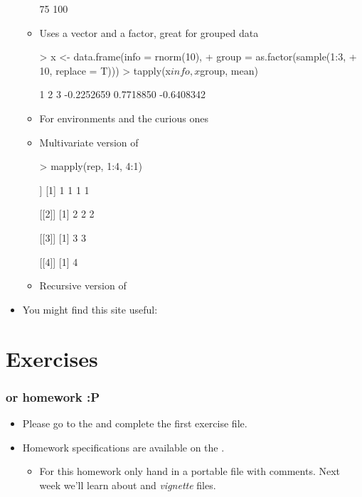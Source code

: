 \begin{frame}
\begin{itemize}
\begin{itemize}
\begin{Schunk}
\begin{Soutput}
75%
100%
\end{Soutput}
\end{Schunk}
  \item {} Uses a vector and a factor, great for grouped data
\begin{Schunk}
\begin{Sinput}
> x <- data.frame(info = rnorm(10), 
+     group = as.factor(sample(1:3, 
+         10, replace = T)))
> tapply(x$info, x$group, mean)
\end{Sinput}
\begin{Soutput}
         1          2          3 
-0.2252659  0.7718850 -0.6408342 
\end{Soutput}
\end{Schunk}
  \item {} For environments and the curious ones
  \item {} Multivariate version of 
\begin{Schunk}
\begin{Sinput}
> mapply(rep, 1:4, 4:1)
\end{Sinput}
\begin{Soutput}
[[1]]
[1] 1 1 1 1

[[2]]
[1] 2 2 2

[[3]]
[1] 3 3

[[4]]
[1] 4
\end{Soutput}
\end{Schunk}
  \item {} Recursive version of 
  \end{itemize}
  \item You might find this site useful: 
  \end{itemize}
\end{frame}

\section{Exercises}

\begin{frame}[allowframebreaks]
  \frametitle{or homework :P}
  \begin{itemize}
  \item Please go to the  and complete the first exercise file.
  \item Homework specifications are available on the . 
  \begin{itemize}
    \item For this homework only hand in a portable  file with comments. Next week we'll learn about  and \emph{vignette} files.
  \end{itemize}
  \end{itemize}
\end{frame}



